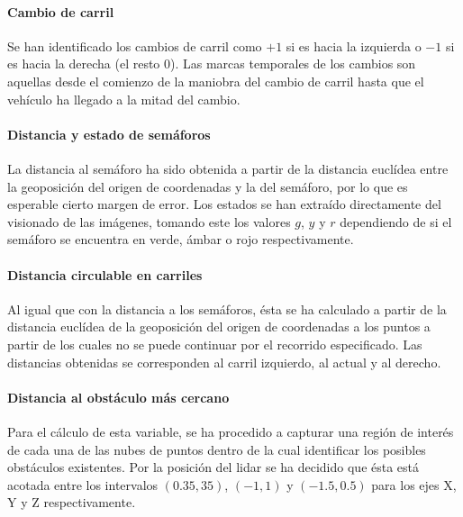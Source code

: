 \paragraph{Cambio de carril}

Se han identificado los cambios de carril como $+1$ si es hacia la izquierda o $-1$ si es hacia la derecha (el resto $0$). Las marcas temporales de los cambios son aquellas desde el comienzo de la maniobra del cambio de carril hasta que el vehículo ha llegado a la mitad del cambio.

\paragraph{Distancia y estado de semáforos}

La distancia al semáforo ha sido obtenida a partir de la distancia euclídea entre la geoposición del origen de coordenadas y la del semáforo, por lo que es esperable cierto margen de error. Los estados se han extraído directamente del visionado de las imágenes, tomando este los valores $g$, $y$ y $r$ dependiendo de si el semáforo se encuentra en verde, ámbar o rojo respectivamente.

\paragraph{Distancia circulable en carriles}

Al igual que con la distancia a los semáforos, ésta se ha calculado a partir de la distancia euclídea de la geoposición del origen de coordenadas a los puntos a partir de los cuales no se puede continuar por el recorrido especificado. Las distancias obtenidas se corresponden al carril izquierdo, al actual y al derecho.

\paragraph{Distancia al obstáculo más cercano}

Para el cálculo de esta variable, se ha procedido a capturar una región de interés de cada una de las nubes de puntos dentro de la cual identificar los posibles obstáculos existentes. Por la posición del \acrshort{lidar} se ha decidido que ésta está acotada entre los intervalos $(0.35, 35)$, $(-1, 1)$ y $(-1.5, 0.5)$ para los ejes X, Y y Z respectivamente.

